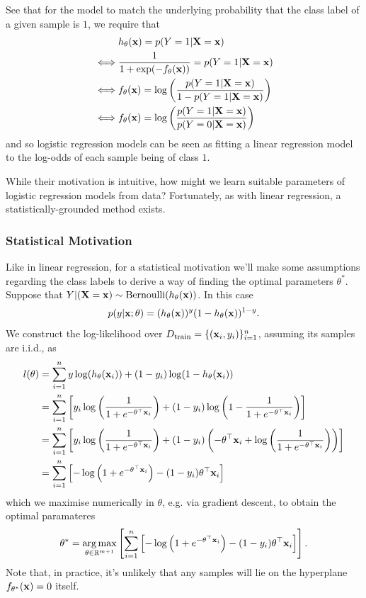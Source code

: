 \documentclass[11pt]{article}
\begin{document}
See that for the model to match the underlying probability that the class label of a given sample is $1$, we require that
\begin{align*}
    &h_{\theta}(\mathbf{x})=p(Y=1|\mathbf{X}=\mathbf{x})\\
    \iff & \frac{1}{1+\exp(-f_{\theta}(\mathbf{x}))}=p(Y=1|\mathbf{X}=\mathbf{x})\\
    \iff & f_{\theta}(\mathbf{x}) = \log\left(\frac{p(Y=1|\mathbf{X}=\mathbf{x})}{1-p(Y=1|\mathbf{X}=\mathbf{x})}\right)\\
    \iff & f_{\theta}(\mathbf{x}) = \log\left(\frac{p(Y=1|\mathbf{X}=\mathbf{x})}{p(Y=0|\mathbf{X}=\mathbf{x})}\right)
\end{align*}
and so logistic regression models can be seen as fitting a linear regression model to the log-odds of each sample being of class $1$.

While their motivation is intuitive, how might we learn suitable parameters of logistic regression models from data? Fortunately, as with linear regression, a statistically-grounded method exists.

\subsubsection{Statistical Motivation}
Like in linear regression, for a statistical motivation we'll make some assumptions regarding the class labels to derive a way of finding the optimal parameters $\theta^{*}$. Suppose that $Y|(\mathbf{X}=\mathbf{x})\sim\text{Bernoulli}(h_{\theta}(\mathbf{x}))$. In this case
$$
p(y|\mathbf{x};\theta)=(h_{\theta}(\mathbf{x}))^{y}(1-h_{\theta}(\mathbf{x}))^{1-y}.
$$
We construct the log-likelihood over $D_{\text{train}}=\{(\mathbf{x}_i,y_i)\}_{i=1}^n$, assuming its samples are i.i.d., as
\begin{align*}
    l(\theta)
    &=
    \sum_{i=1}^ny\log(h_{\theta}(\mathbf{x}_i))+(1-y_i)\log(1-h_{\theta}(\mathbf{x}_i))\\
    &=
    \sum_{i=1}^n\left[y_i\log\left(\frac{1}{1+e^{-\theta^{\top}\mathbf{x}_i}}\right)+(1-y_i)\log\left(1-\frac{1}{1+e^{-\theta^{\top}\mathbf{x}_i}}\right)\right]\\
    &=
    \sum_{i=1}^n\left[y_i\log\left(\frac{1}{1+e^{-\theta^{\top}\mathbf{x}_i}}\right)+(1-y_i)\left(-\theta^{\top}\mathbf{x}_i+\log\left(\frac{1}{1+e^{-\theta^{\top}\mathbf{x}_i}}\right)\right)\right]\\
    &=
    \sum_{i=1}^n\left[-\log\left(1+e^{-\theta^{\top}\mathbf{x}_i}\right)-(1-y_i)\theta^{\top}\mathbf{x}_i\right]
\end{align*}
which we maximise numerically in $\theta$, e.g. via gradient descent, to obtain the optimal paramateres
$$
\theta^{*}
=
\operatorname*{arg\,max}_{\theta\in\mathbb{R}^{m+1}}\left[\sum_{i=1}^n\left[-\log\left(1+e^{-\theta^{\top}\mathbf{x}_i}\right)-(1-y_i)\theta^{\top}\mathbf{x}_i\right]\right].
$$
Note that, in practice, it's unlikely that any samples will lie on the hyperplane $f_{\theta^*}(\mathbf{x})=0$ itself.
\end{document}
